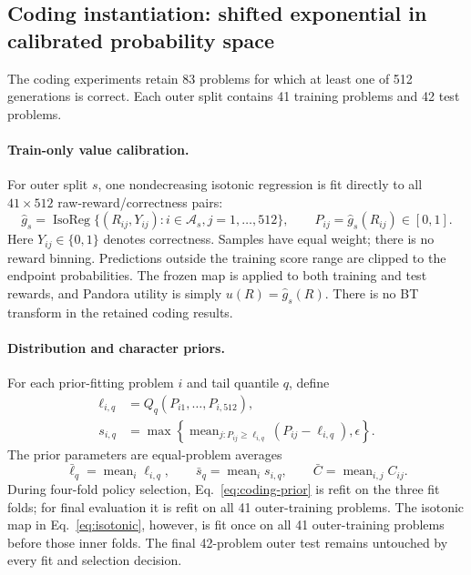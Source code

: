 \subsection{Coding instantiation: shifted exponential in calibrated probability space}
\label{sec:coding-instantiation}

The coding experiments retain 83 problems for which at least one of 512
generations is correct.  Each outer split contains 41 training problems and 42
test problems.

\paragraph{Train-only value calibration.}
For outer split $s$, one nondecreasing isotonic regression is fit directly to
all $41\times512$ raw-reward/correctness pairs:
\begin{equation}
  \widehat g_s
  =\operatorname{IsoReg}\{(R_{ij},Y_{ij}):i\in\mathcal A_s,
      j=1,\ldots,512\},
  \qquad P_{ij}=\widehat g_s(R_{ij})\in[0,1].
  \label{eq:isotonic}
\end{equation}
Here $Y_{ij}\in\{0,1\}$ denotes correctness.  Samples have equal weight;
there is no reward binning.  Predictions outside the training score range are
clipped to the endpoint probabilities.  The frozen map is applied to both
training and test rewards, and Pandora utility is simply $u(R)=\widehat g_s(R)$.
There is no BT transform in the retained coding results.

\paragraph{Distribution and character priors.}
For each prior-fitting problem $i$ and tail quantile $q$, define
\begin{align}
  \ell_{i,q}&=Q_q(P_{i1},\ldots,P_{i,512}),\\
  s_{i,q}&=\max\!\left\{
    \operatorname{mean}_{j:P_{ij}\ge\ell_{i,q}}(P_{ij}-\ell_{i,q}),
    \epsilon
  \right\}.
\end{align}
The prior parameters are equal-problem averages
\begin{equation}
  \bar\ell_q=\operatorname{mean}_i\ell_{i,q},\qquad
  \bar s_q=\operatorname{mean}_i s_{i,q},
  \qquad
  \bar C=\operatorname{mean}_{i,j}C_{ij}.
  \label{eq:coding-prior}
\end{equation}
During four-fold policy selection, Eq.~\eqref{eq:coding-prior} is refit on the
three fit folds; for final evaluation it is refit on all 41 outer-training
problems.  The isotonic map in Eq.~\eqref{eq:isotonic}, however, is fit once on
all 41 outer-training problems before those inner folds.  The final 42-problem
outer test remains untouched by every fit and selection decision.

